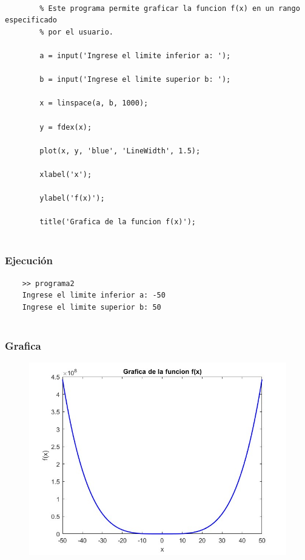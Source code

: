 \documentclass{article}
\begin{document}
	\begin{lstlisting}
		
		% Este programa permite graficar la funcion f(x) en un rango especificado 
		% por el usuario.
		
		a = input('Ingrese el limite inferior a: ');
		
		b = input('Ingrese el limite superior b: ');
		
		x = linspace(a, b, 1000);
		
		y = fdex(x);
		
		plot(x, y, 'blue', 'LineWidth', 1.5);
		
		xlabel('x');
		
		ylabel('f(x)');
		
		title('Grafica de la funcion f(x)');
		
	\end{lstlisting}
	
	\subsubsection{Ejecución}
	
	\begin{lstlisting}
	>> programa2
	Ingrese el limite inferior a: -50
	Ingrese el limite superior b: 50
		
	\end{lstlisting}
	
	\subsubsection{Grafica}
	
	\begin{figure}[H]
		\centering
		\includegraphics[width=\textwidth]{img1.jpg}
	\end{figure}
	
\end{document}
